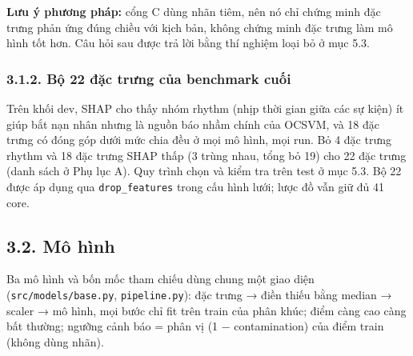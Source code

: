 \documentclass[
  11pt,
]{article}
\begin{document}
\textbf{Lưu ý phương pháp:} cổng C dùng nhãn tiêm, nên nó chỉ chứng minh
đặc trưng phản ứng đúng chiều với kịch bản, không chứng minh đặc trưng
làm mô hình tốt hơn. Câu hỏi sau được trả lời bằng thí nghiệm loại bỏ ở
mục 5.3.

\hypertarget{bux1ed9-22-ux111ux1eb7c-trux1b0ng-cux1ee7a-benchmark-cuux1ed1i}{%
\subsubsection{3.1.2. Bộ 22 đặc trưng của benchmark
cuối}\label{bux1ed9-22-ux111ux1eb7c-trux1b0ng-cux1ee7a-benchmark-cuux1ed1i}}

Trên khối dev, SHAP cho thấy nhóm rhythm (nhịp thời gian giữa các sự
kiện) ít giúp bắt nạn nhân nhưng là nguồn báo nhầm chính của OCSVM, và
18 đặc trưng có đóng góp dưới mức chia đều ở mọi mô hình, mọi run. Bỏ 4
đặc trưng rhythm và 18 đặc trưng SHAP thấp (3 trùng nhau, tổng bỏ 19)
cho 22 đặc trưng (danh sách ở Phụ lục A). Quy trình chọn và kiểm tra
trên test ở mục 5.3. Bộ 22 được áp dụng qua
\texttt{drop\_\allowbreak{}features} trong cấu hình lưới; lược đồ vẫn
giữ đủ 41 core.

\hypertarget{muxf4-huxecnh}{%
\subsection{3.2. Mô hình}\label{muxf4-huxecnh}}

Ba mô hình và bốn mốc tham chiếu dùng chung một giao diện
(\texttt{src/\allowbreak{}models/\allowbreak{}base.\allowbreak{}py},
\texttt{pipeline.\allowbreak{}py}): đặc trưng → điền thiếu bằng median →
scaler → mô hình, mọi bước chỉ fit trên train của phân khúc; điểm càng
cao càng bất thường; ngưỡng cảnh báo = phân vị (1 − contamination) của
điểm train (không dùng nhãn).
\end{document}
